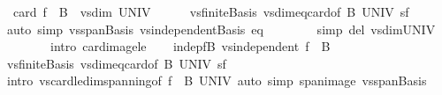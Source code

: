 \begin{isabellebody}
\ {\isacharasterisk}{\kern0pt}{\isacharcolon}{\kern0pt}\ {\isachardoublequoteopen}card\ {\isacharparenleft}{\kern0pt}f\ {\isacharbackquote}{\kern0pt}\ B{}{\isacharparenright}{\kern0pt}\ {\isasymle}\ vs{}{\isachardot}{\kern0pt}dim\ UNIV{\isachardoublequoteclose}\isanewline
\ \ \ \ \isamarkupfalse%
\ vs{}{\isachardot}{\kern0pt}finite{\isacharunderscore}{\kern0pt}Basis\ vs{}{\isachardot}{\kern0pt}dim{\isacharunderscore}{\kern0pt}eq{\isacharunderscore}{\kern0pt}card{\isacharbrackleft}{\kern0pt}of\ B{}\ UNIV{\isacharbrackright}{\kern0pt}\ sf\isanewline
\ \ \ \ \isamarkupfalse%
\ {\isacharparenleft}{\kern0pt}auto\ simp{\isacharcolon}{\kern0pt}\ vs{}{\isachardot}{\kern0pt}span{\isacharunderscore}{\kern0pt}Basis\ vs{}{\isachardot}{\kern0pt}independent{\isacharunderscore}{\kern0pt}Basis\ eq\isanewline
\ \ \ \ \ \ \ \ simp\ del{\isacharcolon}{\kern0pt}\ vs{}{\isachardot}{\kern0pt}dim{\isacharunderscore}{\kern0pt}UNIV\isanewline
\ \ \ \ \ \ \ \ intro{\isacharbang}{\kern0pt}{\isacharcolon}{\kern0pt}\ card{\isacharunderscore}{\kern0pt}image{\isacharunderscore}{\kern0pt}le{\isacharparenright}{\kern0pt}\isanewline
\ \ \isamarkupfalse%
\ indep{\isacharunderscore}{\kern0pt}fB{\isacharcolon}{\kern0pt}\ {\isachardoublequoteopen}vs{}{\isachardot}{\kern0pt}independent\ {\isacharparenleft}{\kern0pt}f\ {\isacharbackquote}{\kern0pt}\ B{}{\isacharparenright}{\kern0pt}{\isachardoublequoteclose}\isanewline
\ \ \ \ \isamarkupfalse%
\ vs{}{\isachardot}{\kern0pt}finite{\isacharunderscore}{\kern0pt}Basis\ vs{}{\isachardot}{\kern0pt}dim{\isacharunderscore}{\kern0pt}eq{\isacharunderscore}{\kern0pt}card{\isacharbrackleft}{\kern0pt}of\ B{}\ UNIV{\isacharbrackright}{\kern0pt}\ sf\ {\isacharasterisk}{\kern0pt}\isanewline
\ \ \ \ \isamarkupfalse%
\ {\isacharparenleft}{\kern0pt}intro\ vs{}{\isachardot}{\kern0pt}card{\isacharunderscore}{\kern0pt}le{\isacharunderscore}{\kern0pt}dim{\isacharunderscore}{\kern0pt}spanning{\isacharbrackleft}{\kern0pt}of\ {\isachardoublequoteopen}f\ {\isacharbackquote}{\kern0pt}\ B{}{\isachardoublequoteclose}\ UNIV{\isacharbrackright}{\kern0pt}{\isacharparenright}{\kern0pt}\ {\isacharparenleft}{\kern0pt}auto\ simp{\isacharcolon}{\kern0pt}\ span{\isacharunderscore}{\kern0pt}image\ vs{}{\isachardot}{\kern0pt}span{\isacharunderscore}{\kern0pt}Basis\ {\isacharparenright}{\kern0pt}\isanewline
\ \ \isamarkupfalse%

\end{isabellebody}
